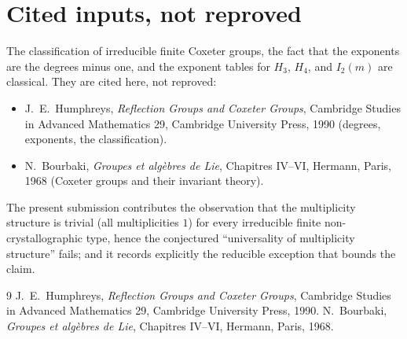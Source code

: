 \documentclass[11pt]{article}
\theoremstyle{definition}
\theoremstyle{remark}
\begin{document}
\section{Cited inputs, not reproved}

The classification of irreducible finite Coxeter groups, the fact that the
exponents are the degrees minus one, and the exponent tables for
$H_3$, $H_4$, and $I_2(m)$ are classical. They are cited here, not reproved:
\begin{itemize}
  \item J.~E.~Humphreys, \emph{Reflection Groups and Coxeter Groups},
        Cambridge Studies in Advanced Mathematics 29, Cambridge University
        Press, 1990 (degrees, exponents, the classification).
  \item N.~Bourbaki, \emph{Groupes et algèbres de Lie}, Chapitres IV--VI,
        Hermann, Paris, 1968 (Coxeter groups and their invariant theory).
\end{itemize}
The present submission contributes the observation that the multiplicity
structure is trivial (all multiplicities $1$) for every irreducible finite
non-crystallographic type, hence the conjectured ``universality of multiplicity
structure'' fails; and it records explicitly the reducible exception that
bounds the claim.

\begin{thebibliography}{9}
 J.~E.~Humphreys, \emph{Reflection Groups and Coxeter
Groups}, Cambridge Studies in Advanced Mathematics 29, Cambridge University
Press, 1990.
 N.~Bourbaki, \emph{Groupes et algèbres de Lie}, Chapitres
IV--VI, Hermann, Paris, 1968.
\end{thebibliography}
\end{document}
